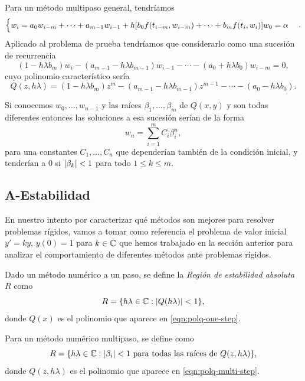 Para un método multipaso general, tendríamos
%
\begin{equation*}
    \begin{cases}
        w_i =
        a_0w_{i-m} + \cdots + a_{m-1}w_{i-1} + h\qty[
            b_0f(t_{i-m}, w_{i-m}) + \cdots + b_mf(t_i, w_i)
        ]
        w_0 = \alpha
    \end{cases}.
\end{equation*}
%
Aplicado al problema de prueba tendríamos que considerarlo como
una sucesión de recurrencia
%
\begin{equation*}
    (1 - h\lambda b_m)w_i
    - (a_{m-1} - h\lambda b_{m-1})w_{i-1}
    - \cdots
    - (a_0 + h\lambda b_0)w_{i-m} = 0,
\end{equation*}
%
cuyo polinomio característico sería
%
\begin{equation}\label{eqn:polq-multi-step}
    Q(z, h\lambda) =
    (1 - h\lambda b_m)z^m
    - (a_{m-1} - h\lambda b_{m-1})z^{m-1}
    - \cdots
    - (a_0 - h\lambda b_0).
\end{equation}

Si conocemos $w_0,\ldots,w_{n-1}$
y las raíces $\beta_1,\ldots,\beta_m$ de $Q(x, y)$
y son todas diferentes %
entonces las soluciones a esa sucesión serían de la forma
%
\begin{equation*}
    w_n = \sum_{i=1}^m C_i\beta_i^n,
\end{equation*}
%
para una constantes $C_1,\ldots,C_n$
que dependerían también de la condición inicial,
y tenderían a $0$ si $\abs{\beta_k} < 1$ para todo $1 \le k \le m$.

\subsection{A-Estabilidad}

En nuestro intento por caracterizar
qué métodos son mejores para resolver problemas rígidos,
vamos a tomar como referencia el problema de valor inicial
$y' = ky$, $y(0) = 1$ para $k \in \mathbb{C}$
que hemos trabajado en la sección anterior
para analizar el comportamiento de diferentes métodos
ante problemas rígidos.

\begin{definition}
    Dado un método numérico a un paso, se define
    la \emph{Región de estabilidad absoluta} $R$
    como
    \begin{equation*}
        R = \qty{h\lambda \in \mathbb{C}: \abs{Q(h\lambda)} < 1},
    \end{equation*}
    donde $Q(x)$ es el polinomio que aparece en \eqref{eqn:polq-one-step}.

    Para un método numérico multipaso, se define como
    \begin{equation*}
        R = \qty{h\lambda \in \mathbb{C}:
        \text{$\abs{\beta_i} < 1$ para todas las raíces de $Q(z, h\lambda)$}},
    \end{equation*}
    donde $Q(z, h\lambda)$ es el polinomio que aparece en
    \eqref{eqn:polq-multi-step}.
\end{definition}

